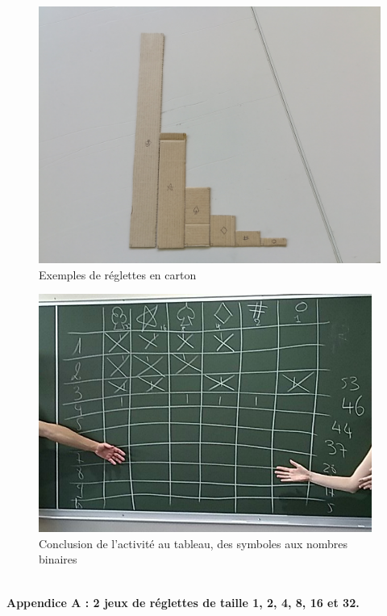 \documentclass[a4paper,12pt]{scrartcl}
\begin{document}
\begin{figure}
\begin{center}
\includegraphics[width=0.7\linewidth]{images/reglettes.jpg} 
\end{center}
\caption{Exemples de réglettes en carton}
\label{fig:lettres}
\end{figure}

\begin{figure}
\begin{center}
\includegraphics[width=0.7\linewidth]{images/tableau.png}
\end{center}
\caption{Conclusion de l'activité au tableau, des symboles aux nombres binaires}
\label{fig:lettres}
\end{figure}

\newpage
~\\
\newpage
\appendix
\thispagestyle{empty}
\bf{Appendice A :} 2 jeux de réglettes de taille 1, 2, 4, 8, 16 et 32.
\bigskip
\bigskip
~\\
\end{document}
